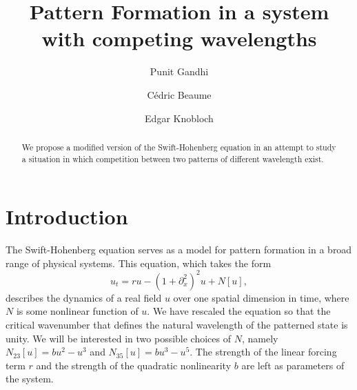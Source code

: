 \documentclass[api,pof,pre,12pt,a4paper]{revtex4-1}
\begin{document}

\title{Pattern Formation in a system with competing wavelengths}

\author{Punit Gandhi}
\author{C\'edric Beaume}
\author{Edgar Knobloch}

\begin{abstract}
We propose a modified version of the Swift-Hohenberg equation in an attempt to study a situation in which competition between two patterns of different wavelength exist.
\end{abstract}

\maketitle

\section{Introduction}
The Swift-Hohenberg equation serves as a model for pattern formation in a broad range of physical systems.   This equation, which takes the form  
\begin{equation}
u_t= r u-\left(1+\partial_{x}^2\right)^2u+N[u]\label{eq:SH},
\end{equation}
describes the dynamics of a real field $u$ over one spatial dimension in time, where $N$ is some nonlinear function of $u$.  We have rescaled the equation so that the critical wavenumber that defines the natural wavelength of the patterned state is unity.  We will be interested in two possible choices of $N$, namely $N_{23}[u]=bu^2-u^3$ and $N_{35}[u]=b u^3-u^5$.  The strength of the linear forcing term $r$ and the strength of the quadratic nonlinearity $b$ are left as parameters of the system.  
\end{document}
